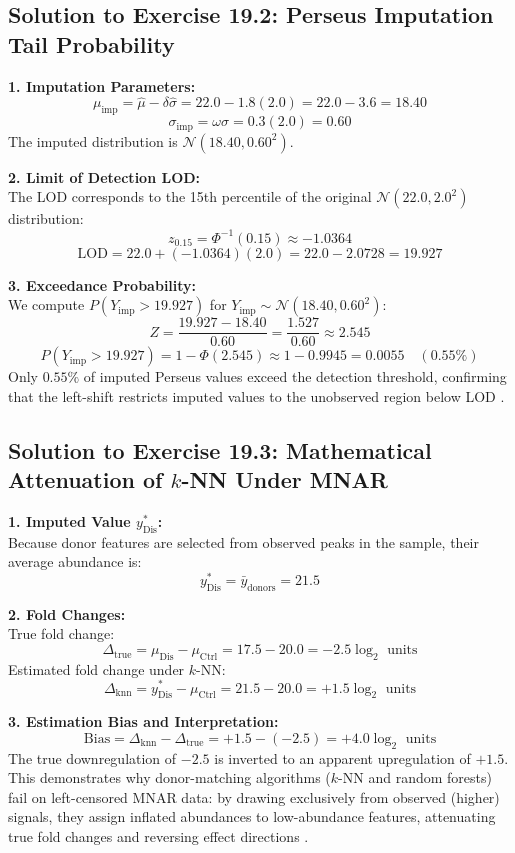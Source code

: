 \documentclass[11pt,oneside]{book}
\begin{document}
\subsection*{Solution to Exercise 19.2: Perseus Imputation Tail Probability}

\textbf{1. Imputation Parameters:}\\
$$\mu_{\text{imp}} = \hat{\mu} - \delta \hat{\sigma} = 22.0 - 1.8(2.0) = 22.0 - 3.6 = 18.40$$
$$\sigma_{\text{imp}} = \omega \hat{\sigma} = 0.3(2.0) = 0.60$$
The imputed distribution is $\mathcal{N}(18.40, 0.60^2)$.

\textbf{2. Limit of Detection LOD:}\\
The LOD corresponds to the 15th percentile of the original $\mathcal{N}(22.0, 2.0^2)$ distribution:
$$z_{0.15} = \Phi^{-1}(0.15) \approx -1.0364$$
$$\text{LOD} = 22.0 + (-1.0364)(2.0) = 22.0 - 2.0728 = 19.927$$

\textbf{3. Exceedance Probability:}\\
We compute $P(Y_{\text{imp}} > 19.927)$ for $Y_{\text{imp}} \sim \mathcal{N}(18.40, 0.60^2)$:
$$Z = \frac{19.927 - 18.40}{0.60} = \frac{1.527}{0.60} \approx 2.545$$
$$P(Y_{\text{imp}} > 19.927) = 1 - \Phi(2.545) \approx 1 - 0.9945 = 0.0055 \quad (0.55\%)$$
Only $0.55\%$ of imputed Perseus values exceed the detection threshold, confirming that the left-shift restricts imputed values to the unobserved region below LOD \cite{tyanova2016perseus}.

\subsection*{Solution to Exercise 19.3: Mathematical Attenuation of $k$-NN Under MNAR}

\textbf{1. Imputed Value $y_{\text{Dis}}^*$:}\\
Because donor features are selected from observed peaks in the sample, their average abundance is:
$$y_{\text{Dis}}^* = \bar{y}_{\text{donors}} = 21.5$$

\textbf{2. Fold Changes:}\\
True fold change:
$$\Delta_{\text{true}} = \mu_{\text{Dis}} - \mu_{\text{Ctrl}} = 17.5 - 20.0 = -2.5 \log_2\text{ units}$$
Estimated fold change under $k$-NN:
$$\Delta_{\text{knn}} = y_{\text{Dis}}^* - \mu_{\text{Ctrl}} = 21.5 - 20.0 = +1.5 \log_2\text{ units}$$

\textbf{3. Estimation Bias and Interpretation:}\\
$$\text{Bias} = \Delta_{\text{knn}} - \Delta_{\text{true}} = +1.5 - (-2.5) = +4.0 \log_2\text{ units}$$
The true downregulation of $-2.5$ is inverted to an apparent upregulation of $+1.5$. This demonstrates why donor-matching algorithms ($k$-NN and random forests) fail on left-censored MNAR data: by drawing exclusively from observed (higher) signals, they assign inflated abundances to low-abundance features, attenuating true fold changes and reversing effect directions \cite{palstrom2020imputation, lazar2016accounting}.
\end{document}
